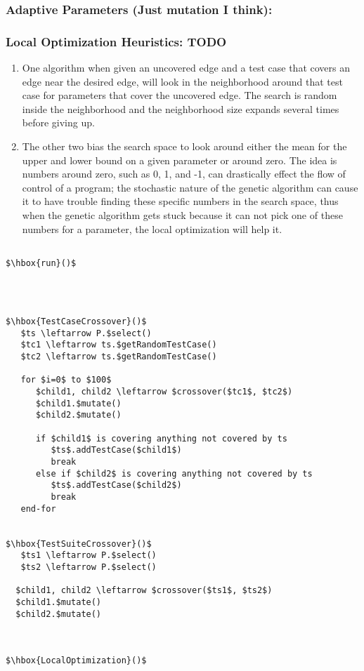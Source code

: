 \documentclass[runningheads]{llncs}
\begin{document}
	
\subsubsection{Adaptive Parameters (Just mutation I think):}	
		
\subsubsection{Local Optimization Heuristics: TODO}			
		\begin{enumerate}
			\item One algorithm when given an uncovered edge and a test case that covers an edge near the desired edge, will look in the neighborhood around that test case for parameters that cover the uncovered edge. The search is random inside the neighborhood and the neighborhood size expands several times before giving up.
			\item The other two bias the search space to look around either the mean for the upper and lower bound on a given parameter or around zero. The idea is numbers around zero, such as 0, 1, and -1, can drastically effect the flow of control of a program; the stochastic nature of the genetic algorithm can cause it to have trouble finding these specific numbers in the search space, thus when the genetic algorithm gets stuck because it can not pick one of these numbers for a parameter, the local optimization will help it.
		\end{enumerate}

\begin{Verbatim}[fontfamily=tt, xleftmargin=10pt, commandchars=\\\{\},
        codes={\catcode`$=3\catcode`^=7\catcode`_=8}]
   
$\hbox{run}()$  



     
$\hbox{TestCaseCrossover}()$  
   $ts \leftarrow P.$select()
   $tc1 \leftarrow ts.$getRandomTestCase()
   $tc2 \leftarrow ts.$getRandomTestCase()
   
   for $i=0$ to $100$
      $child1, child2 \leftarrow $crossover($tc1$, $tc2$)
      $child1.$mutate()
      $child2.$mutate()
      
      if $child1$ is covering anything not covered by ts
         $ts$.addTestCase($child1$)
         break
      else if $child2$ is covering anything not covered by ts
         $ts$.addTestCase($child2$)
         break
   end-for
   

$\hbox{TestSuiteCrossover}()$  
   $ts1 \leftarrow P.$select()
   $ts2 \leftarrow P.$select()
   
  $child1, child2 \leftarrow $crossover($ts1$, $ts2$)
  $child1.$mutate()
  $child2.$mutate()
  


$\hbox{LocalOptimization}()$  

\end{Verbatim}
\end{document}
